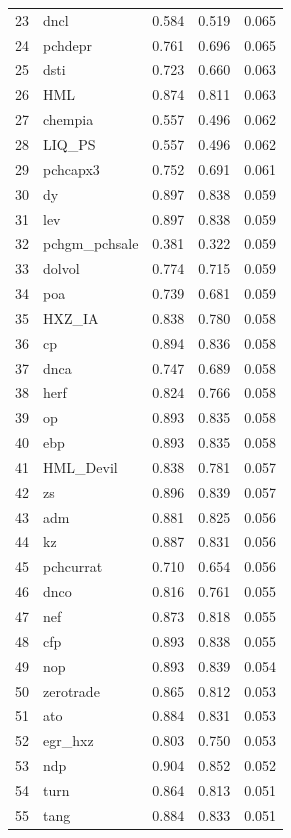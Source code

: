 \documentclass[12pt]{article}
\begin{document}
\begin{footnotesize}
\begin{longtable}{rl|c|c|c}
		23 & dncl & 0.584 & 0.519 & 0.065 \\ 
		24 & pchdepr & 0.761 & 0.696 & 0.065 \\ 
		25 & dsti & 0.723 & 0.660 & 0.063 \\ 
		26 & HML & 0.874 & 0.811 & 0.063 \\ 
		27 & chempia & 0.557 & 0.496 & 0.062 \\ 
		28 & LIQ\_PS & 0.557 & 0.496 & 0.062 \\ 
		29 & pchcapx3 & 0.752 & 0.691 & 0.061 \\ 
		30 & dy & 0.897 & 0.838 & 0.059 \\ 
		31 & lev & 0.897 & 0.838 & 0.059 \\ 
		32 & pchgm\_pchsale & 0.381 & 0.322 & 0.059 \\ 
		33 & dolvol & 0.774 & 0.715 & 0.059 \\ 
		34 & poa & 0.739 & 0.681 & 0.059 \\ 
		35 & HXZ\_IA & 0.838 & 0.780 & 0.058 \\ 
		36 & cp & 0.894 & 0.836 & 0.058 \\ 
		37 & dnca & 0.747 & 0.689 & 0.058 \\ 
		38 & herf & 0.824 & 0.766 & 0.058 \\ 
		39 & op & 0.893 & 0.835 & 0.058 \\ 
		40 & ebp & 0.893 & 0.835 & 0.058 \\ 
		41 & HML\_Devil & 0.838 & 0.781 & 0.057 \\ 
		42 & zs & 0.896 & 0.839 & 0.057 \\ 
		43 & adm & 0.881 & 0.825 & 0.056 \\ 
		44 & kz & 0.887 & 0.831 & 0.056 \\ 
		45 & pchcurrat & 0.710 & 0.654 & 0.056 \\ 
		46 & dnco & 0.816 & 0.761 & 0.055 \\ 
		47 & nef & 0.873 & 0.818 & 0.055 \\ 
		48 & cfp & 0.893 & 0.838 & 0.055 \\ 
		49 & nop & 0.893 & 0.839 & 0.054 \\ 
		50 & zerotrade & 0.865 & 0.812 & 0.053 \\ 
		51 & ato & 0.884 & 0.831 & 0.053 \\ 
		52 & egr\_hxz & 0.803 & 0.750 & 0.053 \\ 
		53 & ndp & 0.904 & 0.852 & 0.052 \\ 
		54 & turn & 0.864 & 0.813 & 0.051 \\ 
		55 & tang & 0.884 & 0.833 & 0.051 \\ 

\end{longtable}
\end{footnotesize}
\end{document}

